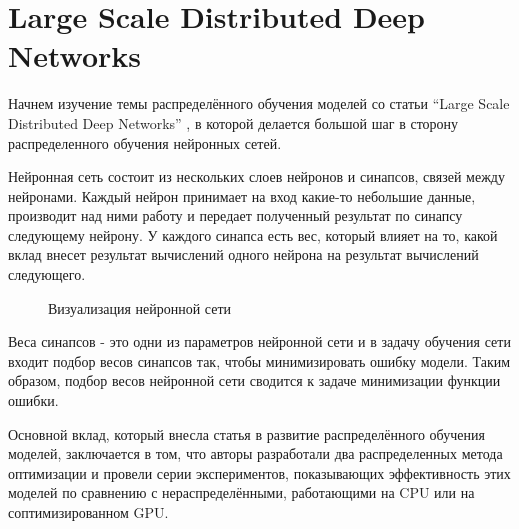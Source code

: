 
\section{Large Scale Distributed Deep Networks}
\indent\setlength{\parindent}{1em} 
Начнем изучение темы распределённого обучения моделей со статьи “Large Scale Distributed Deep Networks” \cite{beginning} , в которой делается большой шаг в сторону распределенного обучения нейронных сетей. 

\indent\setlength{\parindent}{1em} 
Нейронная сеть состоит из нескольких слоев нейронов и синапсов, связей между нейронами. Каждый нейрон принимает на вход какие-то небольшие данные, производит над ними работу и передает полученный результат по синапсу следующему нейрону. У каждого синапса есть вес, который влияет на то, какой вклад внесет результат вычислений одного нейрона на результат вычислений следующего. 
\begin{figure}[h]%
	\centering
	\caption{Визуализация нейронной сети}
	\label{framework} %
\end{figure}

\indent\setlength{\parindent}{1em} 
Веса синапсов - это одни из параметров нейронной сети и в задачу обучения сети входит подбор весов синапсов так, чтобы минимизировать ошибку модели. Таким образом, подбор весов нейронной сети сводится к задаче минимизации функции ошибки.

\indent\setlength{\parindent}{1em} 
Основной вклад, который внесла статья в развитие распределённого обучения моделей, заключается в том, что авторы разработали два распределенных метода оптимизации и провели серии экспериментов, показывающих эффективность этих моделей по сравнению с нераспределёнными, работающими на CPU или на соптимизированном GPU.

